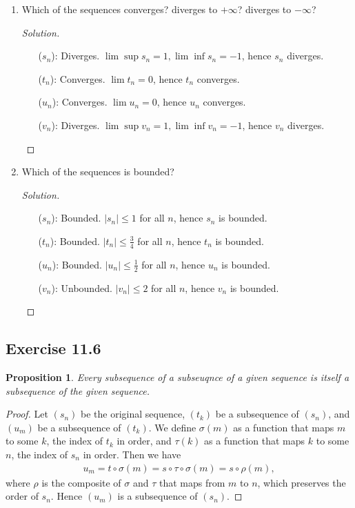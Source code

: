 \documentclass{article}
\newtheorem{proposition}[thm]{Proposition}
\begin{document}
\begin{enumerate}[label=(\alph*)]
    \item Which of the sequences converges? diverges to $+\infty$? diverges to $-\infty$?
    \begin{proof}[Solution]\indent
        \begin{enumerate}
            \item[($s_n$):] Diverges. $\lim \sup s_n = 1, \lim \inf s_n = -1$, hence $s_n$ diverges.
            \item[($t_n$):] Converges. $\lim t_n = 0$, hence $t_n$ converges.
            \item[($u_n$):] Converges. $\lim u_n = 0$, hence $u_n$ converges.
            \item[($v_n$):] Diverges. $\lim \sup v_n=1, \lim\inf v_n=-1$, hence $v_n$ diverges.
        \end{enumerate}
    \end{proof}

    \item Which of the sequences is bounded?
    \begin{proof}[Solution]\indent
        \begin{enumerate}
            \item[($s_n$):] Bounded. $|s_n|\leq 1$ for all $n$, hence $s_n$ is bounded.
            \item[($t_n$):] Bounded. $|t_n|\leq \frac{3}{4}$ for all $n$, hence $t_n$ is bounded.
            \item[($u_n$):] Bounded. $|u_n|\leq \frac{1}{2}$ for all $n$, hence $u_n$ is bounded.
            \item[($v_n$):] Unbounded. $|v_n|\le 2$ for all $n$, hence $v_n$ is bounded.
        \end{enumerate}
    \end{proof}
\end{enumerate}

\subsection*{Exercise 11.6}
\begin{proposition}
    Every subsequence of a subseuqnce of a given sequence is itself a subsequence of the given 
    sequence. 
\end{proposition}
\begin{proof}
    Let $(s_n)$ be the original sequence, $(t_k)$ be a subsequence of $(s_n)$, and $(u_m)$ be a 
    subsequence of $(t_k)$. We define $\sigma(m)$ as a function that maps $m$ to some $k$, the index 
    of $t_k$ in order, and $\tau(k)$ as a function that maps $k$ to some $n$, the index of $s_n$ in
    order. Then we have
    \begin{align*}
        u_m = t \circ \sigma(m) = s \circ \tau \circ \sigma(m) = s \circ \rho(m),
    \end{align*}
    where $\rho$ is the composite of $\sigma$ and $\tau$ that maps from $m$ to $n$, which preserves 
    the order of $s_n$. Hence $(u_m)$ is a subsequence of $(s_n)$.
\end{proof}
\end{document}

